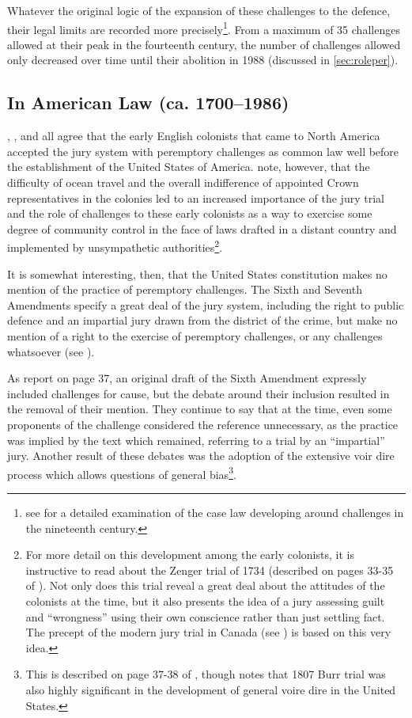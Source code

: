Whatever the original logic of the expansion of these challenges to the defence, their legal limits are recorded more
precisely\footnote{see \cite{brown2000} for a detailed examination of the case law developing around challenges in the nineteenth
  century.}. From a maximum of 35 challenges allowed at their peak in the fourteenth century, the number of challenges allowed only
decreased over time until their abolition in 1988 (discussed in \ref{sec:roleper}).

\subsection{In American Law (ca. 1700--1986)}

\cite{vonmosch1921}, \cite{hoffman1997}, and \cite{vandykejurysel} all agree that the early English colonists that came to North
America accepted the jury system with peremptory challenges as common law well before the establishment of the United States of
America. \cite{hansvidjudging} note, however, that the difficulty of ocean travel and the overall indifference of appointed Crown
representatives in the colonies led to an increased importance of the jury trial and the role of challenges to these early
colonists as a way to exercise some degree of community control in the face of laws drafted in a distant country and implemented
by unsympathetic authorities\footnote{For more detail on this development among the early colonists, it is instructive to read
  about the Zenger trial of 1734 (described on pages 33-35 of \cite{hansvidjudging}). Not only does this trial reveal a great deal
  about the attitudes of the colonists at the time, but it also presents the idea of a jury assessing guilt and ``wrongness''
  using their own conscience rather than just settling fact. The precept of the modern jury trial in Canada (see
  \cite{woolley2018}) is based on this very idea.}.

It is somewhat interesting, then, that the United States constitution makes no mention of the practice of peremptory
challenges. The Sixth and Seventh Amendments specify a great deal of the jury system, including the right to public defence and an
impartial jury drawn from the district of the crime, but make no mention of a right to the exercise of peremptory challenges, or
any challenges whatsoever (see \cite{usconstitution}).

As \cite{hansvidjudging} report on page 37, an original draft of the Sixth Amendment expressly included challenges for cause, but
the debate around their inclusion resulted in the removal of their mention. They continue to say that at the time, even some
proponents of the challenge considered the reference unnecessary, as the practice was implied by the text which remained,
referring to a trial by an ``impartial'' jury. Another result of these debates was the adoption of the extensive voir dire process
which allows questions of general bias\footnote{This is described on page 37-38 of \cite{hansvidjudging}, though \cite{brown2000}
  notes that 1807 Burr trial was also highly significant in the development of general voire dire in the United States.}.

